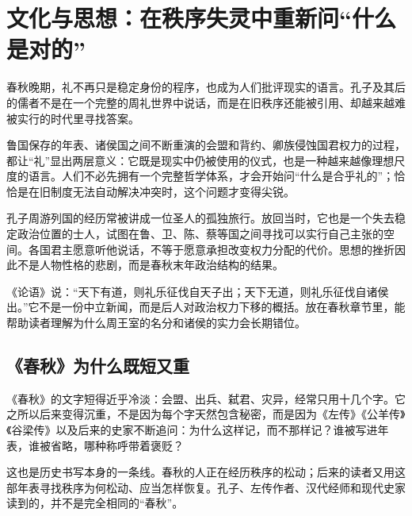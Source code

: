 \section{文化与思想：在秩序失灵中重新问“什么是对的”}

春秋晚期，礼不再只是稳定身份的程序，也成为人们批评现实的语言。孔子及其后的儒者不是在一个完整的周礼世界中说话，而是在旧秩序还能被引用、却越来越难被实行的时代里寻找答案。

鲁国保存的年表、诸侯国之间不断重演的会盟和背约、卿族侵蚀国君权力的过程，都让“礼”显出两层意义：它既是现实中仍被使用的仪式，也是一种越来越像理想尺度的语言。人们不必先拥有一个完整哲学体系，才会开始问“什么是合乎礼的”；恰恰是在旧制度无法自动解决冲突时，这个问题才变得尖锐。

孔子周游列国的经历常被讲成一位圣人的孤独旅行。放回当时，它也是一个失去稳定政治位置的士人，试图在鲁、卫、陈、蔡等国之间寻找可以实行自己主张的空间。各国君主愿意听他说话，不等于愿意承担改变权力分配的代价。思想的挫折因此不是人物性格的悲剧，而是春秋末年政治结构的结果。

\begin{textwindow}[“礼乐征伐自诸侯出”】【论语】]
《论语》说：“天下有道，则礼乐征伐自天子出；天下无道，则礼乐征伐自诸侯出。”它不是一份中立新闻，而是后人对政治权力下移的概括。放在春秋章节里，能帮助读者理解为什么周王室的名分和诸侯的实力会长期错位。
\end{textwindow}

\subsection{《春秋》为什么既短又重}

《春秋》的文字短得近乎冷淡：会盟、出兵、弑君、灾异，经常只用十几个字。它之所以后来变得沉重，不是因为每个字天然包含秘密，而是因为《左传》《公羊传》《谷梁传》以及后来的史家不断追问：为什么这样记，而不那样记？谁被写进年表，谁被省略，哪种称呼带着褒贬？

这也是历史书写本身的一条线。春秋的人正在经历秩序的松动；后来的读者又用这部年表寻找秩序为何松动、应当怎样恢复。孔子、左传作者、汉代经师和现代史家读到的，并不是完全相同的“春秋”。
